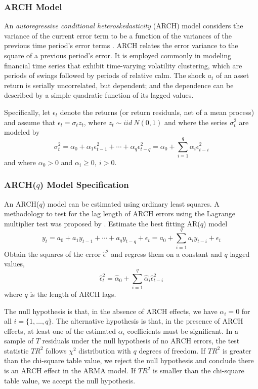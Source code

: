 \subsubsection{ARCH Model}
An \emph{autoregressive conditional heteroskedasticity} (ARCH) model considers the variance of the current error term to be a function of the variances of the previous time period's error terms \cite{engle1982arch}.  ARCH relates the error variance to the square of a previous period's error. It is employed commonly in modeling financial time series that exhibit time-varying volatility clustering, which are periods of swings followed by periods of relative calm. The shock $a_t$ of an asset return is serially uncorrelated, but dependent; and the dependence can be described by a simple quadratic function of its lagged values.


Specifically, let $\epsilon_t$  denote the returns (or return residuals, net of a mean process) and assume that $\epsilon_t=\sigma_t z_t$, where $z_t\sim iid~ N(0,1)$   and where the series $\sigma_t^2$  are modeled by
\[
\sigma_t^2=\alpha_0+\alpha_1 \epsilon_{t-1}^2+\cdots+\alpha_q \epsilon_{t-q}^2 = \alpha_0 + \sum_{i=1}^q \alpha_{i} \epsilon_{t-i}^2 
\]
and where $\alpha_0>0$  and $\alpha_i\ge 0,~i>0$.

\subsubsection{ARCH($q$) Model Specification}

An ARCH($q$) model can be estimated using ordinary least squares. A methodology to test for the lag length of ARCH errors using the Lagrange multiplier test was proposed by . Estimate the best fitting AR($q$) model
\[
y_t = a_0 + a_1 y_{t-1} + \cdots + a_q y_{t-q} + \epsilon_t = a_0 + \sum_{i=1}^q a_i y_{t-i} + \epsilon_t 
\]
Obtain the squares of the error $\hat{\epsilon}^2$  and regress them on a constant and $q$ lagged values,
\[
\hat \epsilon_t^2 = \hat \alpha_0 + \sum_{i=1}^{q} \hat \alpha_i \hat \epsilon_{t-i}^2
\]
where $q$ is the length of ARCH lags.

The null hypothesis is that, in the absence of ARCH effects, we have $\alpha_i = 0$ for all $i = \{1, \ldots, q\}$. The alternative hypothesis is that, in the presence of ARCH effects, at least one of the estimated $\alpha_i$ coefficients must be significant. In a sample of $T$ residuals under the null hypothesis of no ARCH errors, the test statistic $TR^2$ follows $\chi^2$ distribution with $q$ degrees of freedom. If $TR^2$ is greater than the chi-square table value, we reject the null hypothesis and conclude there is an ARCH effect in the ARMA model. If $TR^2$ is smaller than the chi-square table value, we accept the null hypothesis.

